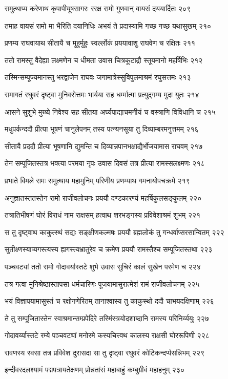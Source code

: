 समुत्थाप्य करेणाथ कृपापीयूषसागरः
ररक्ष रामो गुणवान् वायसं दययार्दितः २०९

तमाह वायसं रामो मा भैरिति दयानिधिः
अभयं ते प्रदास्यामि गच्छ गच्छ यथासुखम् २१०

प्रणम्य राघवायाथ सीतायै च मुहुर्मुहुः
स्वर्ल्लोकं प्रययावाशु राघवेण च रक्षितः २११

ततो रामस्तु वैदेह्या लक्ष्मणेन च धीमता
उवास चित्रकूटाद्रौ स्तूयमानो महर्षिभिः २१२

तस्मिन्सम्पूज्यमानस्तु भरद्वाजेन राघवः
जगामात्रेस्सुविपुलमाश्रमं रघुसत्तमः २१३

समागतं रघुवरं दृष्ट्वा मुनिवरोत्तमः
भार्यया सह धर्म्मात्मा प्रत्युद्गम्य मुदा युतः २१४

आसने सुशुभे मुख्ये निवेश्य सह सीतया
अर्घ्यपाद्याचमनीयं च वस्त्राणि विविधानि च २१५

मधुपर्कन्ददौ प्रीत्या भूषणं चानुलेपनम्
तस्य पत्न्यनसूया तु दिव्याम्बरमनुत्तमम् २१६

सीतायै प्रददौ प्रीत्या भूषणानि द्युमन्ति च
दिव्यान्नपानभक्षाद्यैर्भोजयामास राघवम् २१७

तेन सम्पूजितस्तत्र भक्त्या परमया नृपः
उवास दिवसं तत्र प्रीत्या रामस्सलक्ष्मणः २१८

प्रभाते विमले रामः समुत्थाय महामुनिम्
परिणीय प्रणम्याथ गमनायोपचक्रमे २१९

अनुज्ञातस्ततस्तेन रामो राजीवलोचनः
प्रययौ दण्डकारण्यं महर्षिकुलसङ्कुलम् २२०

तत्रातिभीषणं घोरं विराधं नाम राक्षसम्
हत्वाथ शरभङ्गस्य प्रविवेशाश्रमं शुभम् २२१

स तु दृष्ट्वाथ काकुत्स्थं सद्यः सङ्क्षीणकल्मषः
प्रययौ ब्रह्मलोकं तु गन्धर्वाप्सरसान्वितम् २२२

सुतीक्ष्णस्याप्यगस्त्यस्य ह्यगस्त्यभ्रातुरेव च
क्रमेण प्रययौ रामस्तैश्च सम्पूजितस्तथा २२३

पञ्चवट्यां ततो रामो गोदावर्यास्तटे शुभे
उवास सुचिरं कालं सुखेन परमेण च २२४

तत्र गत्वा मुनिश्रेष्ठास्तापसा धर्मचारिणः
पूजयामासुरात्मेशं रामं राजीवलोचनम् २२५

भयं विज्ञापयामासुस्तं च रक्षोगणेरितम्
तानाश्वास्य तु काकुस्थो ददौ चाभयदक्षिणाम् २२६

ते तु सम्पूजितास्तेन स्वाश्रमान्सम्प्रपेदिरे
तस्मिंस्त्रयोदशाब्दानि रामस्य परिनिर्य्ययुः २२७

गोदावर्य्यास्तटे रम्ये पञ्चवट्यां मनोरमे
कस्यचित्त्वथ कालस्य राक्षसी घोररूपिणी २२८

रावणस्य स्वसा तत्र प्रविवेश दुरासदा
सा तु दृष्ट्वा रघुवरं कोटिकन्दर्प्पसन्निभम् २२९

इन्दीवरदलश्यामं पद्मपत्रायतेक्षणम्
प्रोन्नतांसं महाबाहुं कम्बुग्रीवं महाहनुम् २३०

